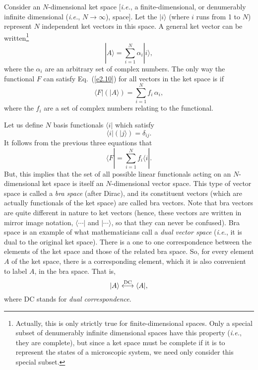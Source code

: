 Consider an $N$-dimensional ket space [{\em i.e.}, a finite-dimensional, or
denumerably infinite dimensional ({\em i.e.}, $N\rightarrow\infty$),  space].
Let the $|i\rangle$ (where $i$ runs from 1 to $N$) 
represent $N$ independent ket vectors in this space. 
A general ket vector can be written\footnote{Actually, this is only 
strictly true for finite-dimensional spaces. Only a special subset
of denumerably infinite dimensional spaces have this property ({\em i.e.}, they
are complete), but since a ket space must be complete if it is
to represent the states of a microscopic system, we need only consider
this special subset.}
\begin{equation}\label{e2.11}
|A\rangle = \sum_{i=1}^N \alpha_i |i\rangle,
\end{equation}
where the $\alpha_i$ are an arbitrary set of complex numbers.
The only way the functional $F$ can satisfy Eq.~(\ref{e2.10}) for all vectors in the ket
space is if
\begin{equation}\label{e2.12}
\langle F|(|A\rangle) = \sum_{i=1}^N f_i \,\alpha_i,
\end{equation}
where the $f_i$ are a set of complex numbers relating to the functional.

Let us  define $N$ basis functionals $\langle i|$ which satisfy
\begin{equation}
\langle i|(|j\rangle) = \delta_{ij}.
\end{equation}
It follows from the previous three equations that
\begin{equation}
\langle F| = \sum_{i=1}^N f_i \langle i|.
\end{equation}
But, this implies that the set  of all possible linear functionals acting
on an $N$-dimensional ket space is itself an $N$-dimensional vector space.
This type of vector
 space is called a {\em bra
space} (after Dirac), and its constituent vectors 
(which are actually functionals of the ket space) are called bra vectors.
Note that bra vectors are
quite different in nature to  ket vectors (hence, these
vectors are written in mirror image notation,
$\langle\cdots|$ and $|\cdots \rangle$, so that they can never be confused). 
Bra space is an example of what  mathematicians call a {\em dual
vector space} ({\em i.e.}, it is dual to the original ket space). There is
a one to one correspondence between the elements of the ket space and those
of the related bra space. So, for every element $A$ of the
ket space, there is a corresponding element, which it is also convenient to
label $A$, in the bra space. That is,
\begin{equation}
|A \rangle \stackrel{\rm DC}{\longleftrightarrow}\langle A|,
\end{equation} 
where DC stands for {\em dual correspondence}.


